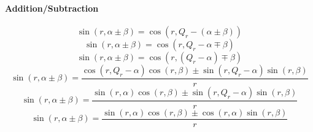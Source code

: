 \documentclass[a4paper,12pt]{report}
\begin{document}
\paragraph{Addition/Subtraction}
\begin{equation}
\sin(r,\alpha \pm \beta) = \cos(r,Q_r - (\alpha \pm \beta))
\end{equation}
\begin{equation}
\sin(r,\alpha \pm \beta) = \cos(r,Q_r - \alpha \mp \beta)
\end{equation}
\begin{equation}
\sin(r,\alpha \pm \beta) = \cos(r,(Q_r - \alpha) \mp \beta)
\end{equation}
\begin{equation}
\sin(r,\alpha \pm \beta) = \frac{\cos(r,Q_r - \alpha) \cos(r,\beta) \pm \sin(r,Q_r - \alpha) \sin(r,\beta)}{r}
\end{equation}
\begin{equation}
\sin(r,\alpha \pm \beta) = \frac{\sin(r,\alpha) \cos(r,\beta) \pm \sin(r,Q_r - \alpha) \sin(r,\beta)}{r}
\end{equation}
\begin{equation}
\sin(r,\alpha \pm \beta) = \frac{\sin(r,\alpha) \cos(r,\beta) \pm \cos(r,\alpha) \sin(r,\beta)}{r}
\end{equation}
\end{document}
